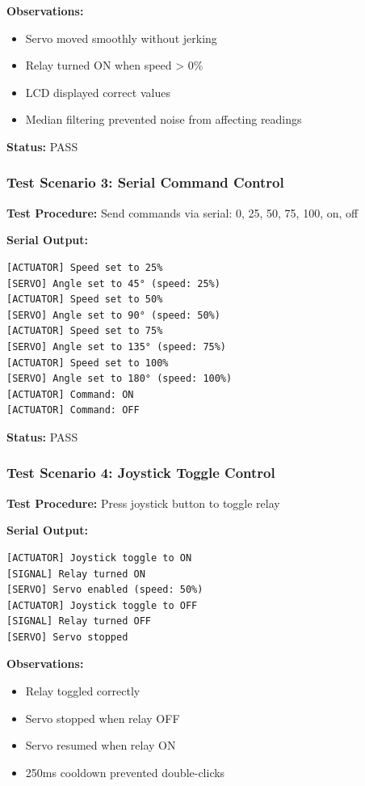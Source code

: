 \documentclass[12pt]{article}
\begin{document}
\textbf{Observations:}
\begin{itemize}
    \item Servo moved smoothly without jerking
    \item Relay turned ON when speed > 0\%
    \item LCD displayed correct values
    \item Median filtering prevented noise from affecting readings
\end{itemize}

\textbf{Status:} PASS

\subsubsection*{Test Scenario 3: Serial Command Control}

\textbf{Test Procedure:} Send commands via serial: 0, 25, 50, 75, 100, on, off

\textbf{Serial Output:}
\begin{verbatim}
[ACTUATOR] Speed set to 25%
[SERVO] Angle set to 45° (speed: 25%)
[ACTUATOR] Speed set to 50%
[SERVO] Angle set to 90° (speed: 50%)
[ACTUATOR] Speed set to 75%
[SERVO] Angle set to 135° (speed: 75%)
[ACTUATOR] Speed set to 100%
[SERVO] Angle set to 180° (speed: 100%)
[ACTUATOR] Command: ON
[ACTUATOR] Command: OFF
\end{verbatim}

\textbf{Status:} PASS

\subsubsection*{Test Scenario 4: Joystick Toggle Control}

\textbf{Test Procedure:} Press joystick button to toggle relay

\textbf{Serial Output:}
\begin{verbatim}
[ACTUATOR] Joystick toggle to ON
[SIGNAL] Relay turned ON
[SERVO] Servo enabled (speed: 50%)
[ACTUATOR] Joystick toggle to OFF
[SIGNAL] Relay turned OFF
[SERVO] Servo stopped
\end{verbatim}

\textbf{Observations:}
\begin{itemize}
    \item Relay toggled correctly
    \item Servo stopped when relay OFF
    \item Servo resumed when relay ON
    \item 250ms cooldown prevented double-clicks
\end{itemize}
\end{document}
